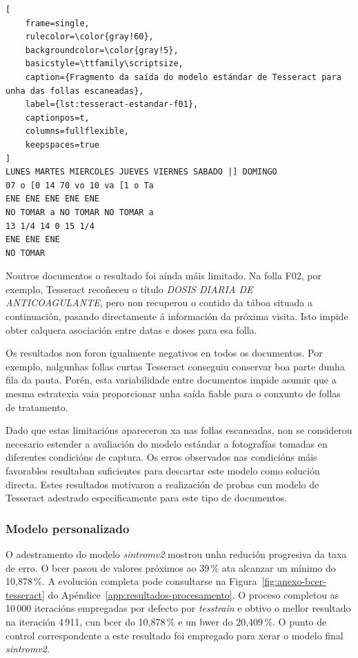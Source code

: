 \begin{lstlisting}[
    frame=single,
    rulecolor=\color{gray!60},
    backgroundcolor=\color{gray!5},
    basicstyle=\ttfamily\scriptsize,
    caption={Fragmento da saída do modelo estándar de Tesseract para unha das follas escaneadas},
    label={lst:tesseract-estandar-f01},
    captionpos=t,
    columns=fullflexible,
    keepspaces=true
]
LUNES MARTES MIERCOLES JUEVES VIERNES SABADO |] DOMINGO
07 o [0 14 70 vo 10 va [1 o Ta
ENE ENE ENE ENE ENE
NO TOMAR a NO TOMAR NO TOMAR a
13 1/4 14 0 15 1/4
ENE ENE ENE
NO TOMAR
\end{lstlisting}

Noutros documentos o resultado foi aínda máis limitado. Na folla F02, por exemplo, Tesseract recoñeceu o título \textit{DOSIS DIARIA DE
ANTICOAGULANTE}, pero non recuperou o contido da táboa situada a continuación, pasando directamente á información da próxima visita.
Isto impide obter calquera asociación entre datas e doses para esa folla.

Os resultados non foron igualmente negativos en todos os documentos. Por exemplo, nalgunhas follas curtas Tesseract conseguiu conservar boa parte dunha fila da pauta. Porén, esta variabilidade entre documentos impide asumir que a mesma estratexia vaia proporcionar unha saída fiable para o conxunto de follas de tratamento.

Dado que estas limitacións apareceron xa nas follas escaneadas, non se considerou necesario estender a avaliación do modelo estándar a fotografías tomadas en diferentes condicións de captura. Os erros observados nas condicións máis favorables resultaban suficientes para descartar este modelo como solución directa. Estes resultados motivaron a realización de probas cun modelo de Tesseract adestrado especificamente para este tipo de documentos.

\subsubsection{Modelo personalizado}

O adestramento do modelo \textit{sintromv2} mostrou unha redución progresiva da taxa de erro. O \gls{bcer} pasou de valores próximos ao 39\,\% ata alcanzar un mínimo do 10,878\,\%. A evolución completa pode consultarse na Figura~\ref{fig:anexo-bcer-tesseract} do Apéndice~\ref{app:resultados-procesamento}.
O proceso completou as 10\,000 iteracións empregadas por defecto por \textit{tesstrain} e obtivo o mellor resultado na
iteración 4\,911, cun \gls{bcer} do 10,878\,\% e un \gls{bwer} do 20,409\,\%. O punto de control correspondente a este resultado foi empregado para xerar o modelo final \textit{sintromv2}.

